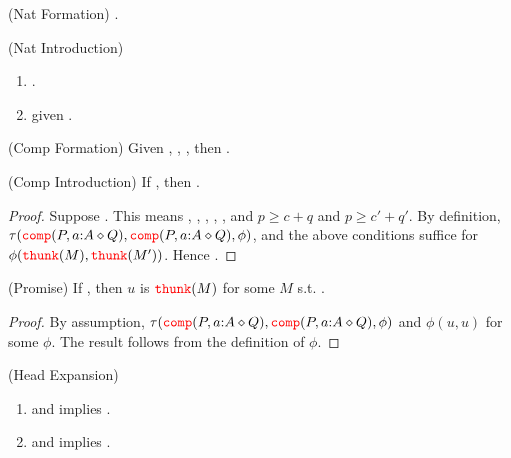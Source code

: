 \begin{lemma}(Nat Formation)
  \eqType{\lift{\nat}}{\lift{\nat}}.
\end{lemma}

\begin{lemma}(Nat Introduction)
  \begin{enumerate}
    \item \eqVal{\zero}{\zero}{\nat}. 
    \item {} given .
  \end{enumerate}
\end{lemma}

\begin{lemma}(Comp Formation)
  Given , , , then
  .
\end{lemma}

\begin{lemma}(Comp Introduction)
  If , then
  .
\end{lemma}

\begin{proof}
  Suppose . This means
  , , , 
  , , and 
  $p \ge c + q$ and $p \ge c' + q'$.
  By definition, $\tau({\color{red}{\mathtt{comp}}}(P, a {:} A \diamond Q), {\color{red}{\mathtt{comp}}}(P, a {:} A \diamond Q), \phi)$, and 
  the above conditions suffice for $\phi({\color{red}{\mathtt{thunk}}}(M),{\color{red}{\mathtt{thunk}}}(M'))$. Hence 
  .
\end{proof}

\begin{lemma}(Promise)
  If , 
  then $u$ is ${\color{red}{\mathtt{thunk}}}(M)$ for some $M$ s.t. .
\end{lemma}

\begin{proof}
  By assumption, $\tau({\color{red}{\mathtt{comp}}}(P, a {:} A \diamond Q), {\color{red}{\mathtt{comp}}}(P, a {:} A \diamond Q), \phi)$ and 
  $\phi(u,u)$ for some $\phi$. The result follows from the definition of $\phi$.
\end{proof}

\begin{lemma}(Head Expansion)\label{lemma:headexp}
  \begin{enumerate}
    \item {} and  implies .
    \item {} and  implies 
      .
  \end{enumerate}
\end{lemma}

